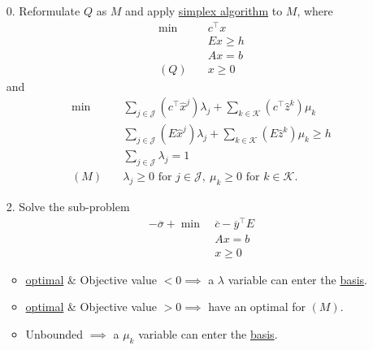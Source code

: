 \begin{enumerate}
	\item[0.] Reformulate \(Q\) as \(M\) and apply \hyperref[algo:simplex-algorithm]{simplex algorithm} to \(M\), where
		\[
			\begin{aligned}
				\min~    & c^{\top}x \\
				         & Ex \geq h \\
				         & Ax = b    \\
				(Q)\quad & x\geq 0
			\end{aligned}
		\]
		and
		\[
			\begin{aligned}
				\min~    & \sum\limits_{j\in\mathcal{J}}\left(c^{\top}\hat{x}^j\right)\lambda_{j} + \sum\limits_{k\in\mathcal{K}}\left(c^{\top} \hat{z}^k  \right)\mu_k \\
				         & \sum\limits_{j\in\mathcal{J}}\left(E\hat{x}^j\right)\lambda_{j} + \sum\limits_{k\in\mathcal{K}}\left(E \hat{z}^k \right)\mu_k \geq h         \\
				         & \sum\limits_{j\in\mathcal{J}}\lambda_{j} = 1                                                                                                 \\
				(M)\quad & \lambda_{j}\geq 0 \text{ for }j\in\mathcal{J},\ \mu_k\geq 0 \text{ for }k\in\mathcal{K}.
			\end{aligned}
		\]
	\item[2.] Solve the sub-problem
		\[
			\begin{aligned}
				-\overline{\sigma}+\min~ & \overline{c} - \overline{y}^{\top}E \\
				                         & Ax = b                              \\
				                         & x\geq 0
			\end{aligned}
		\]
		\begin{itemize}
			\item \hyperref[def:optimal-solution]{optimal} \& Objective value \(<0 \implies\) a \(\lambda\) variable can enter the \hyperref[def:basic]{basis}.
			\item \hyperref[def:optimal-solution]{optimal} \& Objective value \(>0 \implies\) have an optimal for \((M)\).
			\item Unbounded \(\implies\) a \(\mu_k\) variable can enter the \hyperref[def:basic]{basis}.
		\end{itemize}
\end{enumerate}

